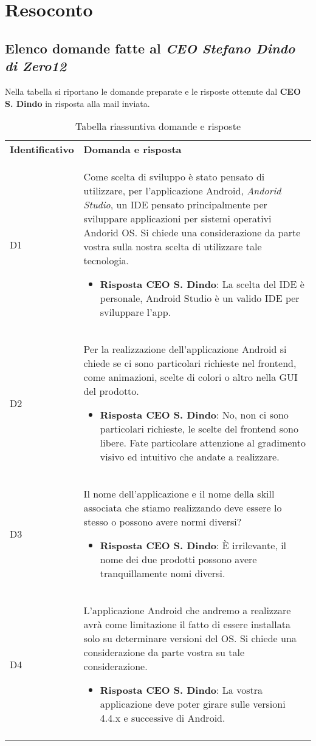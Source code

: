 \clearpage
\section{Resoconto}
	\subsection{Elenco domande fatte al \emph{CEO Stefano Dindo di Zero12}}
	\label{sec:elenco}
	Nella tabella si riportano le domande preparate e le risposte ottenute dal \textbf{CEO S. Dindo} in risposta alla mail inviata.
		\begin{center}
			\renewcommand{\arraystretch}{1.5}
			\begin{longtable}{  p{2.5cm} p{11.7cm} }
				\rowcolor{tableHeadYellow}
				\textbf{Identificativo}&\textbf{Domanda e risposta}\\
				D1 & Come scelta di sviluppo è stato pensato di utilizzare, per l'applicazione Android, \textit{Andorid Studio}, un IDE pensato principalmente per sviluppare applicazioni per sistemi operativi Andorid OS. Si chiede una considerazione da parte vostra sulla nostra scelta di utilizzare tale tecnologia.
				\begin{itemize}
					\item \textbf{Risposta CEO S. Dindo}: La scelta del IDE è personale, Android Studio è un valido IDE per sviluppare l'app.
				\end{itemize}
				\\
				D2 & Per la realizzazione dell'applicazione Android si chiede se ci sono particolari richieste nel frontend, come animazioni, scelte di colori o altro nella GUI del prodotto.
				\begin{itemize}
					\item \textbf{Risposta CEO S. Dindo}: No, non ci sono particolari richieste, le scelte del frontend sono libere. Fate particolare attenzione al gradimento visivo ed intuitivo che andate a realizzare.
				\end{itemize}
				\\
				D3 & Il nome dell'applicazione e il nome della skill associata che stiamo realizzando deve essere lo stesso o possono avere normi diversi?
				\begin{itemize}
					\item \textbf{Risposta CEO S. Dindo}: È irrilevante, il nome dei due prodotti possono avere tranquillamente nomi diversi. 
				\end{itemize}
				\\
				D4 & L'applicazione Android che andremo a realizzare avrà come limitazione il fatto di essere installata solo su determinare versioni del OS. Si chiede una considerazione da parte vostra su tale considerazione.
				\begin{itemize} 
					\item \textbf{Risposta CEO S. Dindo}: La vostra applicazione deve poter girare sulle versioni 4.4.x e successive di Android.
				\end{itemize}
				\\
				\rowcolor{white}
				\caption{Tabella riassuntiva domande e risposte}
			\end{longtable}	
		\end{center}
	
	
